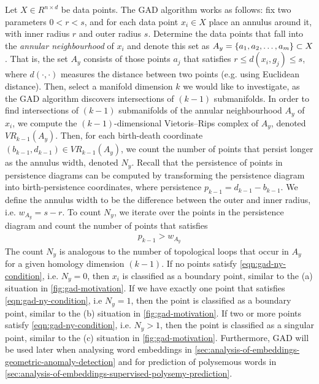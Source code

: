 Let $X \in R^{n \times d}$ be data points. The GAD algorithm works as follows: fix two parameters $0 < r < s$, and for each data point $x_i \in X$ place an annulus around it, with inner radius $r$ and outer radius $s$. Determine the data points that fall into the \textit{annular neighbourhood} of $x_i$ and denote this set as $A_y = \left\{a_1, a_2, \ldots, a_m\right\} \subset X$. That is, the set $A_y$ consists of those points $a_j$ that satisfies $r \leq d(x_i, g_j) \leq s$, where $d(\cdot, \cdot)$ measures the distance between two points (e.g. using Euclidean distance). Then, select a manifold dimension $k$ we would like to investigate, as the GAD algorithm discovers intersections of $(k-1)$ submanifolds. In order to find intersections of $(k-1)$ submanifolds of the annular neighbourhood $A_y$ of $x_i$, we compute the $(k-1)$-dimensional Vietoris–Rips complex of $A_y$, denoted $VR_{k-1}(A_y)$. Then, for each birth-death coordinate $(b_{k-1}, d_{k-1}) \in VR_{k-1}(A_y)$, we count the number of points that persist longer as the annulus width, denoted $N_y$. Recall that the persistence of points in persistence diagrams can be computed by transforming the persistence diagram into birth-persistence coordinates, where persistence $p_{k-1} = d_{k-1} - b_{k-1}$. We define the annulus width to be the difference between the outer and inner radius, i.e. $w_{A_y} = s - r$. To count $N_y$, we iterate over the points in the persistence diagram and count the number of points that satisfies
\begin{align}
    p_{k-1} > w_{A_y}
    \label{eqn:gad-ny-condition}
\end{align}
The count $N_y$ is analogous to the number of topological loops that occur in $A_y$ for a given homology dimension $(k-1)$. If no points satisfy \cref{eqn:gad-ny-condition}, i.e. $N_y=0$, then $x_i$ is classified as a boundary point, similar to the (a) situation in \cref{fig:gad-motivation}. If we have exactly one point that satisfies \cref{eqn:gad-ny-condition}, i.e $N_y=1$, then the point is classified as a boundary point, similar to the (b) situation in \cref{fig:gad-motivation}. If two or more points satisfy \cref{eqn:gad-ny-condition}, i.e. $N_y>1$, then the point is classified as a singular point, similar to the (c) situation in \cref{fig:gad-motivation}. Furthermore, GAD will be used later when analysing word embeddings in \cref{sec:analysis-of-embeddings-geometric-anomaly-detection} and for prediction of polysemous words in \cref{sec:analysis-of-embeddings-supervised-polysemy-prediction}. 